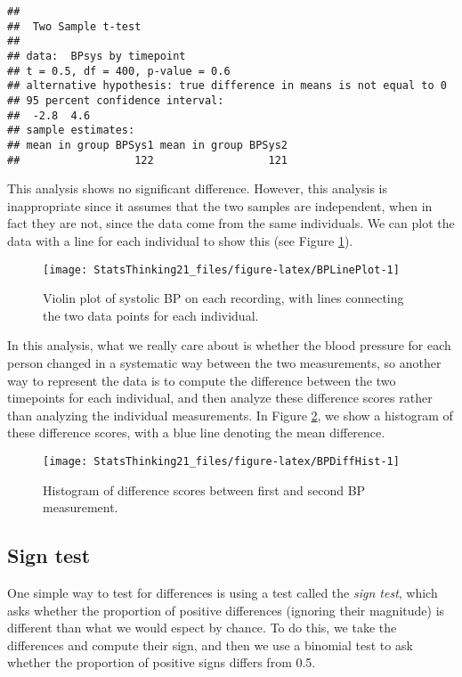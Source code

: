 \documentclass[]{book}
\theoremstyle{definition}
\theoremstyle{definition}
\theoremstyle{definition}
\theoremstyle{remark}
\begin{document}
\begin{verbatim}
## 
##  Two Sample t-test
## 
## data:  BPsys by timepoint
## t = 0.5, df = 400, p-value = 0.6
## alternative hypothesis: true difference in means is not equal to 0
## 95 percent confidence interval:
##  -2.8  4.6
## sample estimates:
## mean in group BPSys1 mean in group BPSys2 
##                  122                  121
\end{verbatim}

This analysis shows no significant difference. However, this analysis is
inappropriate since it assumes that the two samples are independent,
when in fact they are not, since the data come from the same
individuals. We can plot the data with a line for each individual to
show this (see Figure \ref{fig:BPLinePlot}).

\begin{figure}
\texttt{[image: StatsThinking21\_files/figure-latex/BPLinePlot-1]} \caption{Violin plot of systolic BP on each recording, with lines connecting the two data points for each individual.}\label{fig:BPLinePlot}
\end{figure}

In this analysis, what we really care about is whether the blood
pressure for each person changed in a systematic way between the two
measurements, so another way to represent the data is to compute the
difference between the two timepoints for each individual, and then
analyze these difference scores rather than analyzing the individual
measurements. In Figure \ref{fig:BPDiffHist}, we show a histogram of
these difference scores, with a blue line denoting the mean difference.

\begin{figure}
\texttt{[image: StatsThinking21\_files/figure-latex/BPDiffHist-1]} \caption{Histogram of difference scores between first and second BP measurement.}\label{fig:BPDiffHist}
\end{figure}

\subsection{Sign test}\label{sign-test}

One simple way to test for differences is using a test called the
\emph{sign test}, which asks whether the proportion of positive
differences (ignoring their magnitude) is different than what we would
espect by chance. To do this, we take the differences and compute their
sign, and then we use a binomial test to ask whether the proportion of
positive signs differs from 0.5.
\end{document}
